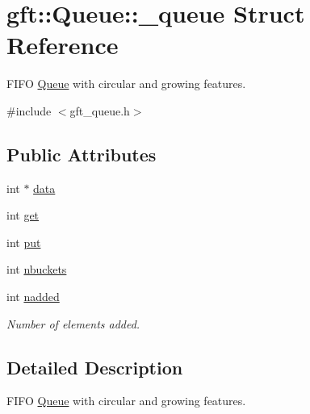 \hypertarget{structgft_1_1Queue_1_1__queue}{\section{gft\-:\-:Queue\-:\-:\-\_\-queue Struct Reference}
\label{structgft_1_1Queue_1_1__queue}
}


F\-I\-F\-O \hyperlink{namespacegft_1_1Queue}{Queue} with circular and growing features.  




{\ttfamily \#include $<$gft\-\_\-queue.\-h$>$}

\subsection*{Public Attributes}
\begin{DoxyCompactItemize}
\item 
int $\ast$ \hyperlink{structgft_1_1Queue_1_1__queue_a306d1f000046c6b8f31cdbaa79073401}{data}
\item 
int \hyperlink{structgft_1_1Queue_1_1__queue_a8c802bf1bbd217d89aea8a71cc3f6ee8}{get}
\item 
int \hyperlink{structgft_1_1Queue_1_1__queue_a48a458b35f17d2a4460e8675508e872c}{put}
\item 
int \hyperlink{structgft_1_1Queue_1_1__queue_a07cec5556e3d465ec8487e6142071b10}{nbuckets}
\item 
int \hyperlink{structgft_1_1Queue_1_1__queue_ad93612d6060096d1561bd99327e8b70c}{nadded}
\begin{DoxyCompactList}\small\item\em Number of elements added. \end{DoxyCompactList}\end{DoxyCompactItemize}


\subsection{Detailed Description}
F\-I\-F\-O \hyperlink{namespacegft_1_1Queue}{Queue} with circular and growing features. 

